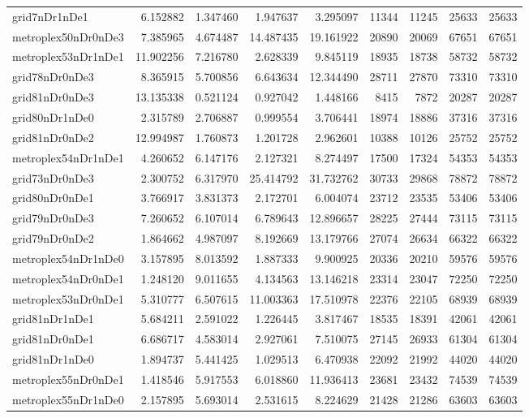 \begin{longtable}{|l|r|r|r|r|r|r|r|r|}
grid7nDr1nDe1 & 6.152882 & 1.347460 & 1.947637 & 3.295097 & 11344 & 11245 & 25633 & 25633 \\
metroplex50nDr0nDe3 & 7.385965 & 4.674487 & 14.487435 & 19.161922 & 20890 & 20069 & 67651 & 67651 \\
metroplex53nDr1nDe1 & 11.902256 & 7.216780 & 2.628339 & 9.845119 & 18935 & 18738 & 58732 & 58732 \\
grid78nDr0nDe3 & 8.365915 & 5.700856 & 6.643634 & 12.344490 & 28711 & 27870 & 73310 & 73310 \\
grid81nDr0nDe3 & 13.135338 & 0.521124 & 0.927042 & 1.448166 & 8415 & 7872 & 20287 & 20287 \\
grid80nDr1nDe0 & 2.315789 & 2.706887 & 0.999554 & 3.706441 & 18974 & 18886 & 37316 & 37316 \\
grid81nDr0nDe2 & 12.994987 & 1.760873 & 1.201728 & 2.962601 & 10388 & 10126 & 25752 & 25752 \\
metroplex54nDr1nDe1 & 4.260652 & 6.147176 & 2.127321 & 8.274497 & 17500 & 17324 & 54353 & 54353 \\
grid73nDr0nDe3 & 2.300752 & 6.317970 & 25.414792 & 31.732762 & 30733 & 29868 & 78872 & 78872 \\
grid80nDr0nDe1 & 3.766917 & 3.831373 & 2.172701 & 6.004074 & 23712 & 23535 & 53406 & 53406 \\
grid79nDr0nDe3 & 7.260652 & 6.107014 & 6.789643 & 12.896657 & 28225 & 27444 & 73115 & 73115 \\
grid79nDr0nDe2 & 1.864662 & 4.987097 & 8.192669 & 13.179766 & 27074 & 26634 & 66322 & 66322 \\
metroplex54nDr1nDe0 & 3.157895 & 8.013592 & 1.887333 & 9.900925 & 20336 & 20210 & 59576 & 59576 \\
metroplex54nDr0nDe1 & 1.248120 & 9.011655 & 4.134563 & 13.146218 & 23314 & 23047 & 72250 & 72250 \\
metroplex53nDr0nDe1 & 5.310777 & 6.507615 & 11.003363 & 17.510978 & 22376 & 22105 & 68939 & 68939 \\
grid81nDr1nDe1 & 5.684211 & 2.591022 & 1.226445 & 3.817467 & 18535 & 18391 & 42061 & 42061 \\
grid81nDr0nDe1 & 6.686717 & 4.583014 & 2.927061 & 7.510075 & 27145 & 26933 & 61304 & 61304 \\
grid81nDr1nDe0 & 1.894737 & 5.441425 & 1.029513 & 6.470938 & 22092 & 21992 & 44020 & 44020 \\
metroplex55nDr0nDe1 & 1.418546 & 5.917553 & 6.018860 & 11.936413 & 23681 & 23432 & 74539 & 74539 \\
metroplex55nDr1nDe0 & 2.157895 & 5.693014 & 2.531615 & 8.224629 & 21428 & 21286 & 63603 & 63603 \\

\end{longtable}
